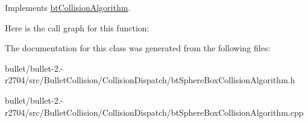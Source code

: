 Implements \hyperlink{classbt_collision_algorithm}{bt\+Collision\+Algorithm}.



Here is the call graph for this function\+:




The documentation for this class was generated from the following files\+:\begin{DoxyCompactItemize}
\item 
bullet/bullet-\/2.-\/r2704/src/\+Bullet\+Collision/\+Collision\+Dispatch/bt\+Sphere\+Box\+Collision\+Algorithm.\+h\item 
bullet/bullet-\/2.-\/r2704/src/\+Bullet\+Collision/\+Collision\+Dispatch/bt\+Sphere\+Box\+Collision\+Algorithm.\+cpp\end{DoxyCompactItemize}
